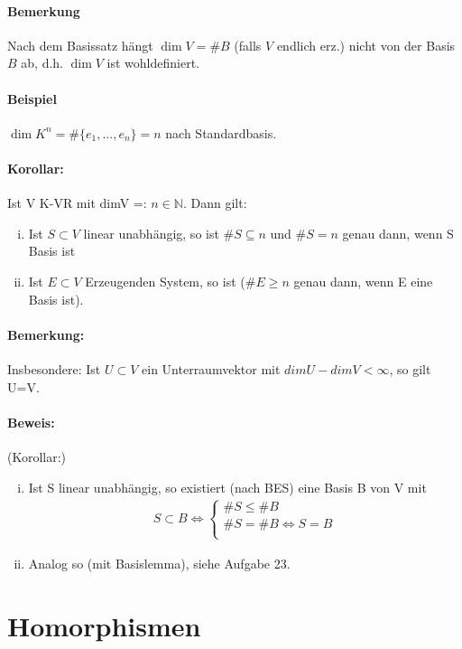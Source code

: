 \paragraph{Bemerkung}
    Nach dem Basissatz hängt $\dim V = \#B$ (falls $V$ endlich erz.) nicht von der Basis $B$ ab, d.h. $\dim V$ ist wohldefiniert.
\paragraph{Beispiel}
    $\dim K^n = \#\{e_1,...,e_n\} = n$ nach Standardbasis.
 \paragraph{Korollar:} Ist V K-VR mit dimV =: $n\in \mathbb{N}$. Dann gilt:
    \begin{enumerate}[(i)]
    	\item Ist $S \subset V$ linear unabhängig, so ist $\# S \subseteq n$ und $\# S = n$ genau dann, wenn S Basis ist
    	\item Ist $E \subset V$ Erzeugenden System, so ist ($\#E \geq n$ genau dann, wenn E eine Basis ist).
    \end{enumerate}
    \paragraph{Bemerkung:} Insbesondere: Ist $U\subset V$ ein Unterraumvektor mit $dimU-dimV < \infty$, so gilt U=V.
   
    \paragraph{Beweis:} (Korollar:)
    \begin{enumerate}[(i)]
    	\item Ist S linear unabhängig, so existiert (nach BES) eine Basis B von V mit 
			 \begin{gather*}
			    S\subset B\Leftrightarrow\left \{
				    \begin{array}{l}
					    \#S \leq \#B\\
						\#S = \#B \Leftrightarrow S = B\\
					\end{array}
			    \right.
		    \end{gather*}
		    \item Analog so (mit Basislemma), siehe Aufgabe 23.
	 \end{enumerate}   
	 

\section{Homorphismen}
